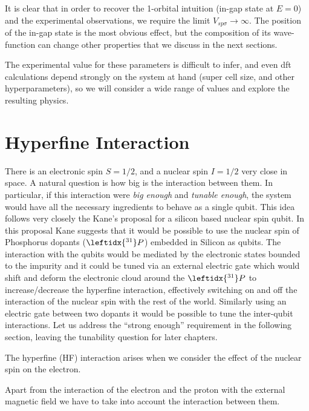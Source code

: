 It is clear that in order to recover the 1-orbital intuition (in-gap state at $E=0$) and the experimental observations\cite{Sofo2012,Brihuega2016}, we require the limit $V_{sp\sigma}\to\infty$. The position of the in-gap state is the most obvious effect, but the composition of its wave-function can change other properties that we discuss in the next sections.


The experimental value for these parameters is difficult to infer\cite{}, and even \ac{dft} calculations depend strongly on the system at hand (super cell size, and other hyperparameters), so we will consider a wide range of values and explore the resulting physics.



\section{Hyperfine Interaction}
\label{sec:hyperfine}
There is an electronic spin $S=1/2$, and a nuclear spin $I=1/2$ very close in space. A natural question is how big is the interaction between them. In particular, if this interaction were \emph{big enough} and \emph{tunable enough}, the system would have all the necessary ingredients to behave as a single qubit.
This idea follows very closely the Kane's proposal for a silicon based nuclear spin qubit\cite{Kane1988}. In this proposal Kane suggests that it would be possible to use the nuclear spin of Phosphorus dopants ($\leftidx{^{31}}P$) embedded in Silicon as qubits. The interaction with the qubits would be mediated by the electronic states bounded to the impurity and it could be tuned via an external electric gate which would shift and deform the electronic cloud around the $\leftidx{^{31}}P$ to increase/decrease the hyperfine interaction, effectively switching on and off the interaction of the nuclear spin with the rest of the world.
Similarly using an electric gate between two dopants it would be possible to tune the inter-qubit interactions.
Let us address the ``strong enough'' requirement in the following section, leaving the tunability question for later chapters. 

The hyperfine (HF) interaction arises when we consider the effect of the nuclear spin on the electron.

Apart from the interaction of the electron and the proton with the external magnetic field we have to take into account the interaction between them.

